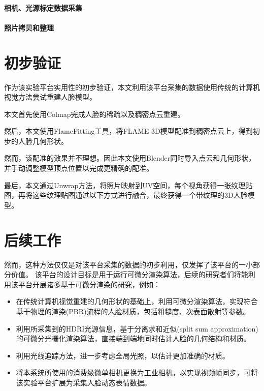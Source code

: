 \paragraph{相机、光源标定数据采集}

\paragraph{照片拷贝和整理}

\section{初步验证}

作为该实验平台实用性的初步验证，本文利用该平台采集的数据使用传统的计算机视觉方法尝试重建人脸模型。

本文首先使用Colmap完成人脸的稀疏以及稠密点云重建。

然后，本文使用FlameFitting工具，将FLAME 3D模型配准到稠密点云上，得到初步的人脸几何形状。

然而，该配准的效果并不理想。因此本文使用Blender同时导入点云和几何形状，并手动调整模型顶点位置以完成更精确的配准。

最后，本文通过Unwrap方法，将照片映射到UV空间，每个视角获得一张纹理贴图，再将这些纹理贴图通过以下方式进行融合，最终获得一个带纹理的3D人脸模型。



\section{后续工作}

然而，这种方法仅仅是对该平台采集的数据的初步利用，仅发挥了该平台的一小部分价值。
该平台的设计目标是用于运行可微分渲染算法，后续的研究者们将能利用该平台开展诸多基于可微分渲染的研究，例如：
\begin{itemize}
\item 在传统计算机视觉重建的几何形状的基础上，利用可微分渲染算法，实现符合基于物理的渲染(PBR)流程的人脸材质，包括粗糙度、次表面散射等参数。
\item 利用所采集到的HDRI光源信息，基于分离求和近似(split sum approximation)的可微分光栅化渲染算法，直接端到端地同时估计人脸的几何结构和材质。
\item 利用光线追踪方法，进一步考虑全局光照，以估计更加准确的材质。
\item 将本系统所使用的消费级微单相机更换为工业相机，以实现视频帧同步，可将该实验平台扩展为采集人脸动态表情数据。
\end{itemize}
